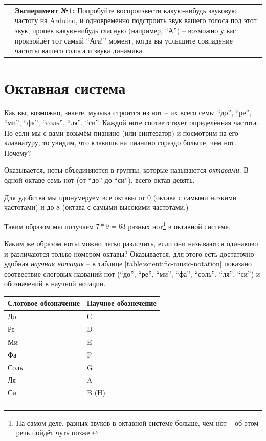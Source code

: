 \documentclass[a4paper,twoside]{book}
\newcommand{\experiment}[2]{
  \vspace{8pt}
  \begin{tabularx}{\textwidth}{m{1cm} m{9cm}}
    
    & \textbf{Эксперимент №#1:} #2 \\
  \end{tabularx}
}
\begin{document}
\experiment{1}{ Попробуйте воспроизвести какую-нибудь звуковую частоту на Arduino,
  и одновременно подстроить звук вашего голоса под этот звук, пропев
  какую-нибудь гласную (например, ``А'') -- возможно у вас произойдёт тот самый
  ``Ага!'' момент, когда вы услышите совпадение частоты вашего голоса и звука
  динамика.}

\section{Октавная система}

Как вы, возможно, знаете, музыка строится из нот -- их всего семь: ``до'',
``ре'', ``ми'', ``фа'', ``соль'', ``ля'', ``си''. Каждой ноте соответствует
определённая частота. Но если мы с вами возьмём пианино (или синтезатор) и
посмотрим на его клавиатуру, то увидим, что клавишь на пианино гораздо больше,
чем нот.  Почему?

Оказывается, ноты объединяются в группы, которые называются \emph{октавами}. В
одной октаве семь нот (от ``до'' до ``си''), всего октав девять.

Для удобства мы пронумеруем все октавы от 0 (октава с самыми низкими частотами)
и до 8 (октава с самыми высокими частотами.)

Таким образом мы получаем $7 * 9 = 63$ разных нот\footnote{На самом деле, разных
звуков в октавной системе больше, чем нот -- об этом речь пойдёт чуть позже.} в
октавной системе.

Каким же образом ноты можно легко различить, если они называются одинаково и
различаются только номером октавы? Оказывается, для этого есть достаточно
удобная \emph{научная нотация} -- в таблице \ref{table:scientific-music-notation}
показано соотвествие слоговых названий нот (``до'', ``ре'', ``ми'', ``фа'',
``соль'', ``ля'', ``си'') и обозначений в научной нотации.

\begin{tabular}{p{4cm}|p{4cm}}
  Слоговое обозначение & Научное обознечение \\
  \hline \hline
  До   & С \\
  \hline
  Ре   & D \\
  \hline
  Ми   & E \\
  \hline
  Фа   & F \\
  \hline
  Соль & G \\
  \hline
  Ля   & A \\
  \hline
  Си   & B (H) \\
  \hline
  \label{table:scientific-music-notation}
\end{tabular}
\end{document}

